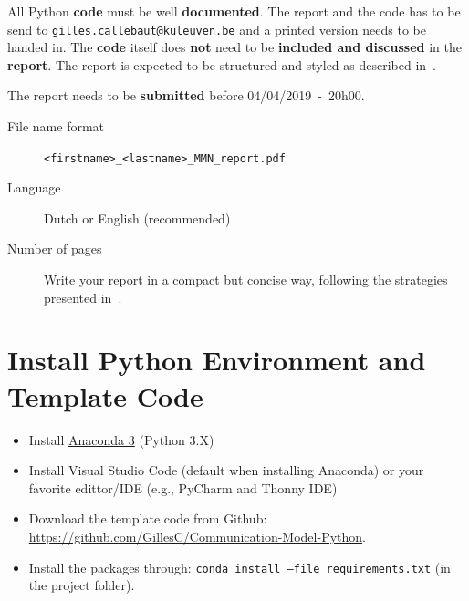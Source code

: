 \documentclass[12pt,a4paper]{article}
\newcommand{\softDeadline}{04/04/2019\ -\ 20h00}
\begin{document}
All Python \textbf{code} must be well \textbf{documented}.
The report and the code has to be send to \texttt{gilles.callebaut@kuleuven.be} and a printed version needs to be handed in. The \textbf{code} itself does \textbf{not} need to be \textbf{included and discussed} in the \textbf{report}. 
The report is expected to be structured and styled as described in~\cite{hoogenboom2012write,kallestinova2011write}.

The report needs to be \textbf{submitted} before \softDeadline.

\begin{description}
	\item[File name format]  \texttt{<firstname>\_<lastname>\_MMN\_report.pdf}
	\item[Language] Dutch or English (recommended)
	\item[Number of pages] Write your report in a compact but concise way, following the
	strategies presented in~\cite{hoogenboom2012write,kallestinova2011write}.
\end{description}

\cleardoublepage%
\appendix
\section{Install Python Environment and Template Code}
\begin{itemize}
	\item Install \href{https://www.anaconda.com/distribution/#download-section}{Anaconda 3} (Python 3.X)
	\item Install Visual Studio Code (default when installing Anaconda) or your favorite edittor/IDE (e.g., PyCharm and Thonny IDE)
	\item Download the template code from Github: \url{https://github.com/GillesC/Communication-Model-Python}.
	\item Install the packages through: \texttt{conda install --file requirements.txt} (in the project folder).
\end{itemize}






\end{document}
